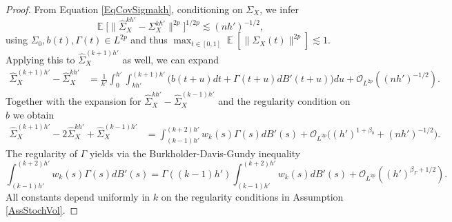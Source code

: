 \documentclass[preprint,aos]{imsart}
\numberwithin{equation}{section}
\theoremstyle{remark}
\DeclareMathOperator{\E}{{\mathbb E}}
\providecommand{\norm}[1]{\lVert #1 \rVert}
\providecommand{\mr}{\color{blue}}
\begin{document}
\begin{appendix}
\begin{proof}
From Equation \eqref{EqCovSigmakh}, conditioning on $\Sigma_X$, we infer
\[ \E\Big[\norm{\hat\Sigma_X^{kh'}-\Sigma_X^{kh'}}^{2p}\Big]^{1/2p}\lesssim (nh')^{-1/2},\]
using $\Sigma_0,b(t),\Gamma(t)\in L^{2p}$ and thus $\max_{t\in[0,1]}\E[\norm{\Sigma_X(t)}^{2p}]\lesssim 1$. Applying this to $\hat\Sigma_X^{(k+1)h'}$ as well, we can  expand
\begin{align*}
\hat\Sigma_X^{(k+1)h'}-\hat\Sigma_X^{kh'}&=
\frac1{h'}\int_0^{h'}\int_{kh'}^{(k+1)h'}\big(b(t+u)dt+\Gamma(t+u)dB'(t+u)\big)du+{\mathcal O}_{L^{2p}}((nh')^{-1/2}).
\end{align*}
Together with the expansion for $\hat\Sigma_X^{kh'}-\hat\Sigma_X^{(k-1)h'}$ and the regularity condition on $b$ we obtain
\begin{align*}
\hat\Sigma_X^{(k+1)h'}-2\hat\Sigma_X^{kh'}+\hat\Sigma_X^{(k-1)h'}
&=\int_{(k-1)h'}^{(k+2)h'}w_k(s)\Gamma(s)dB'(s)+{\mathcal O}_{L^{2p}}\Big((h')^{1+\beta_b}+(nh')^{-1/2}\Big).
\end{align*}
The regularity of $\Gamma$ yields via the Burkholder-Davis-Gundy inequality
\[ \int_{(k-1)h'}^{(k+2)h'}w_k(s)\Gamma(s)dB'(s)=\Gamma((k-1)h')\int_{(k-1)h'}^{(k+2)h'}w_k(s)dB'(s)+{\mathcal O}_{L^{2p}}((h')^{\beta_\Gamma+1/2}).
\]
All constants depend uniformly in $k$ on the  regularity conditions in Assumption \ref{AssStochVol}.
\end{proof}

\begin{comment}
\begin{proof}
From equation \eqref{EqCovSigmakh}, conditioning on $\Sigma_X$, we infer with a uniform constant over $k$
\[ \E\Big[\norm{\hat\Sigma_X^{kh'}-\Sigma_X^{kh'}}^4\Big]\lesssim (nh')^{-2},\]
using $\Sigma_0,b(t),\Gamma(t)\in L^4$ and thus $\sup_t\E[\norm{\Sigma_X(t)}^4]\lesssim 1$. Applying this to $\hat\Sigma_X^{lh'}$ as well, we can  expand
\begin{align*}
\hat\Sigma_X^{lh'}-\hat\Sigma_X^{kh'}&=
\frac1{h'}\int_0^{h'}\int_{kh'}^{lh'}\big(b(t+u)dt+\Gamma(t+u)dB(t+u)\big)du+{\mathcal O}_{L^4}((nh')^{-1/2})\\
&=\int_{kh'}^{(l+1)h'}w(s)\Gamma(s)dB(s)+{\mathcal O}_{L^4}\Big({\mr(l-k)h'}+(nh')^{-1/2}\Big)
\end{align*}
with $w(s)=1$ for $s\in[(k+1)h',lh']$, $w(s)=(s-kh')/h'$ for $s\in[kh',(k+1)h']$ and $w(s)=(l+1)-s/h'$ for $s\in[lh',(l+1)h']$.
Observing that $w\not=1$ only holds on intervals of length $h'$, we obtain
\[ \int_{kh'}^{(l+1)h'}w(s)\Gamma(s)dB(s)=\int_{kh'}^{(l+1)h'}\Gamma(s)dB(s)+{\mathcal O}_{L^4}\big(h'\big).
\]
If we further observe $\int_{kh'}^{lh'}\Gamma(s)dB(s)={\mathcal O}_{L^2}((l-k)h')^{1/2}$, the result follows by taking squares.
\end{proof}
\end{comment}


\end{appendix}
\end{document}

